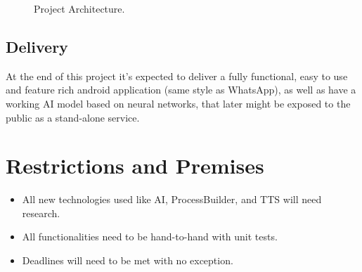 \documentclass[11pt,a4paper]{article}
\begin{document}
	\vspace{20mm}
			\begin{figure}[ht!]
				\vspace*{-2.30cm}
				\centering
				\caption{Project Architecture.}
			\end{figure}
	\subsection{Delivery}
	At the end of this project it's expected to deliver a fully functional, easy to use and feature rich android application (same style as WhatsApp), as well as have a working
	AI model based on neural networks, that later might be exposed to the public as a stand-alone service.

\section{Restrictions and Premises}
	\begin{itemize}
		\item All new technologies used like AI, ProcessBuilder, and TTS will need research. 
		\item All functionalities need to be hand-to-hand with unit tests.
		\item Deadlines will need to be met with no exception.	
	\end{itemize}
\end{document}
